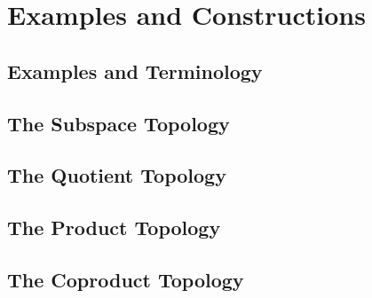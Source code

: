 \chapter{Examples and Constructions}

\section{Examples and Terminology}








\section{The Subspace Topology}




\section{The Quotient Topology}




\section{The Product Topology}



\section{The Coproduct Topology}


